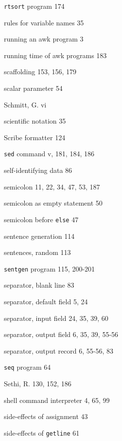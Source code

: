 \begin{multicols}{3}
\hangindent=3pc  \verb'rtsort' program 174

\hangindent=3pc  rules for variable names 35

\hangindent=3pc  running an awk program 3

\hangindent=3pc  running time of awk programs 183

\hangindent=3pc  scaffolding 153, 156, 179

\hangindent=3pc  scalar parameter 54

\hangindent=3pc  Schmitt, G. vi

\hangindent=3pc  scientific notation 35

\hangindent=3pc  Scribe formatter 124

\hangindent=3pc  \verb'sed' command v, 181, 184, 186

\hangindent=3pc  self-identifying data 86

\hangindent=3pc  semicolon 11, 22, 34, 47, 53, 187

\hangindent=3pc  semicolon as empty statement 50

\hangindent=3pc  semicolon before \verb'else' 47

\hangindent=3pc  sentence generation 114

\hangindent=3pc  sentences, random 113

\hangindent=3pc  \verb'sentgen' program 115, 200-201

\hangindent=3pc  separator, blank line 83

\hangindent=3pc  separator, default field 5, 24

\hangindent=3pc  separator, input field 24, 35, 39, 60

\hangindent=3pc  separator, output field 6, 35, 39, 55-56

\hangindent=3pc  separator, output record 6, 55-56,  83

\hangindent=3pc  \verb'seq' program 64

\hangindent=3pc  Sethi, R. 130, 152, 186

\hangindent=3pc  shell command interpreter 4, 65, 99

\hangindent=3pc  side-effects of assignment 43

\hangindent=3pc  side-effects of \verb'getline' 61


\end{multicols}
